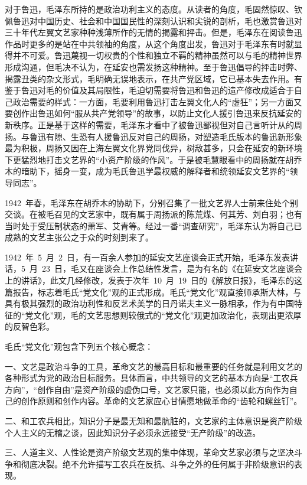 对于鲁迅，毛泽东所持的是政治功利主义的态度。从读者的角度，毛固然惊叹、钦佩鲁迅对中国历史、社会和中国国民性的深刻认识和尖锐的剖析，毛也激赏鲁迅对三十年代左翼文艺家种种浅薄所作的无情的揭露和抨击。但是，毛泽东在阅读鲁迅作品时更多的是站在中共领袖的角度，从这个角度出发，鲁迅对于毛泽东有时就显得并不可爱。鲁迅蔑视一切权贵的个性和独立不羁的精神虽然可以与毛的精神世界形成沟通，但毛决不认为，在延安也需发扬这种精神。至于鲁迅倡导的抨击时弊、揭露丑类的杂文形式，毛明确无误地表示，在共产党区域，它已基本失去作用。有鉴于鲁迅对毛的价值及其局限性，毛迫切需要将鲁迅和鲁迅的遗产修改成适合于自己政治需要的样式：一方面，毛要利用鲁迅打击左翼文化人的“虚狂”；另一方面又要创作出鲁迅如何“服从共产党领导”的故事，以防止文化人援引鲁迅来反抗延安的新秩序。正是基于这样的需要，毛泽东才看中了被鲁迅鄙视但对自己言听计从的周扬。与鲁迅有隙、生恐有人援鲁迅反对自己的周扬，对塑造毛氏版本的鲁迅新形象最为积极，周扬又因在上海左翼文化界党同伐异，树敌甚多，只会在延安的新环境下更猛烈地打击文艺界的“小资产阶级的作风”。于是被毛慧眼看中的周扬就在胡乔木的暗助下，摇身一变，成为毛氏鲁迅学最权威的解释者和统领延安文艺界的“领导同志”。

1942~年春，毛泽东在胡乔木的协助下，分别召集了一批文艺界人士前来住处个别交谈。在被毛召见的文艺家中，既有属于周扬派的陈荒煤、何其芳、刘白羽；也有当时处于受压制状态的萧军、艾青等。经过一番“调查研究”，毛泽东认为将自己已成熟的文艺主张公之于众的时刻到来了。

1942~年~5~月~2~日，有一百余人参加的延安文艺座谈会正式开始，毛泽东发表讲话，5~月~23~日，毛又在座谈会上作总结性发言，是为有名的《在延安文艺座谈会上的讲话》，此文几经修改，发表于次年~10~月~19~日的《解放日报》，毛泽东的这篇报告，标志着毛氏“党文化”观的正式形成。毛氏“党文化”观直接师承斯大林，与具有极其强烈的政治功利性和反艺术美学的日丹诺夫主义一脉相承，作为有中国特征的“党文化”观，毛的文艺思想则较俄式的“党文化”观更加政治化，表现出更浓厚的反智色彩。

毛氏“党文化”观包含下列五个核心概念：

一、文艺是政治斗争的工具，革命文艺的最高目标和最重要的任务就是利用文艺的各种形式为党的政治目标服务。具体而言，中共领导的文艺的基本方向是“工农兵方向”，“创作自由”是资产阶级的虚伪口号，文艺家只能，也必须以此方向作为自己的创作原则和创作内容。革命的文艺家应心甘情愿地做革命的“齿轮和螺丝钉”。

二、和工农兵相比，知识分子是最无知和最肮脏的，文艺家的主体意识是资产阶级个人主义的无稽之谈，因此知识分子必须永远接受“无产阶级”的改造。

三、人道主义、人性论是资产阶级文艺观的集中体现，革命文艺家必须与之坚决斗争和彻底决裂。绝不允许描写工农兵在反抗、斗争之外的任何属于非阶级意识的表现。

